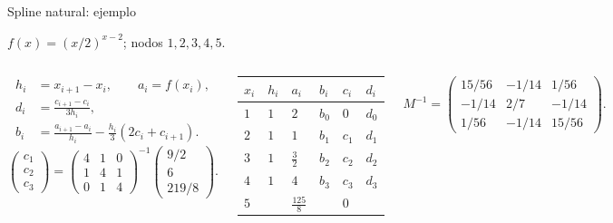 \documentclass[original_version/main.tex]{subfiles}
\begin{document}
\begin{frame}[t]{Spline natural: ejemplo}
\par\noindent\begin{minipage}[t][9mm][t]{\textwidth}\small\strut $f(x)=(x/2)^{x-2}$; nodos $1,2,3,4,5$.\end{minipage}\par\nointerlineskip
\begin{columns}[T]\scriptsize\begin{align*}
h_i&=x_{i+1}-x_i,\qquad a_i=f(x_i),\\
d_i&=\frac{c_{i+1}-c_i}{3h_i},\\
b_i&=\frac{a_{i+1}-a_i}{h_i}-\frac{h_i}{3}(2c_i+c_{i+1}).
\end{align*}\scriptsize\[\begin{pmatrix}c_1\\c_2\\c_3\end{pmatrix}=\begin{pmatrix}4&1&0\\1&4&1\\0&1&4\end{pmatrix}^{-1}\begin{pmatrix}9/2\\6\\219/8\end{pmatrix}.\]\begin{minipage}[t]{\textwidth}\begingroup\scriptsize\setlength{\tabcolsep}{2pt}\begin{center}\begin{tabular}{|C{.12\textwidth}|C{.12\textwidth}|C{.12\textwidth}|C{.12\textwidth}|C{.12\textwidth}|C{.12\textwidth}|}\hline
\rule[-2mm]{0pt}{6mm}$x_i$&$h_i$&$a_i$&$b_i$&$c_i$&$d_i$\\\hline
\rule[-2.5mm]{0pt}{7mm}$1$&$1$&$2$&$b_0$&$0$&$d_0$\\\hline
\rule[-2.5mm]{0pt}{7mm}$2$&$1$&$1$&$b_1$&$c_1$&$d_1$\\\hline
\rule[-2.5mm]{0pt}{7mm}$3$&$1$&$\frac{3}{2}$&$b_2$&$c_2$&$d_2$\\\hline
\rule[-2.5mm]{0pt}{7mm}$4$&$1$&$4$&$b_3$&$c_3$&$d_3$\\\hline
\rule[-2.5mm]{0pt}{7mm}$5$&&$\frac{125}{8}$&&$0$&\\\hline
\end{tabular}\end{center}\endgroup\end{minipage}\par
\scriptsize\[M^{-1}=\begin{pmatrix}15/56&-1/14&1/56\\-1/14&2/7&-1/14\\1/56&-1/14&15/56\end{pmatrix}.\]\end{columns}
\end{frame}
\end{document}
